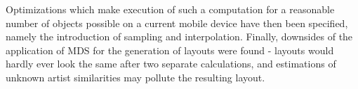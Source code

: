 Optimizations which make execution of such a computation for a reasonable number of objects possible on a current mobile device have then been specified, namely the introduction of sampling and interpolation. Finally, downsides of the application of MDS for the generation of layouts were found - layouts would hardly ever look the same after two separate calculations, and estimations of unknown artist similarities may pollute the resulting layout.